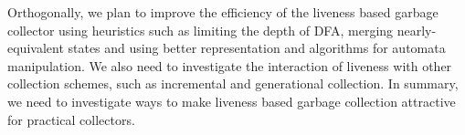 \documentclass[9pt]{sigplanconf}
\begin{document}
  Orthogonally,  we plan  to improve  the efficiency  of the  liveness
  based garbage collector using heuristics  such as limiting the depth
  of  DFA,   merging  nearly-equivalent   states  and   using  better
  representation  and algorithms  for automata  manipulation. We  also
  need  to   investigate  the  interaction  of   liveness  with  other
  collection schemes, such as incremental and generational collection.
  In  summary, we  need to  investigate  ways to  make liveness  based
  garbage collection attractive for practical collectors.  

\balance
{}

\end{document}
